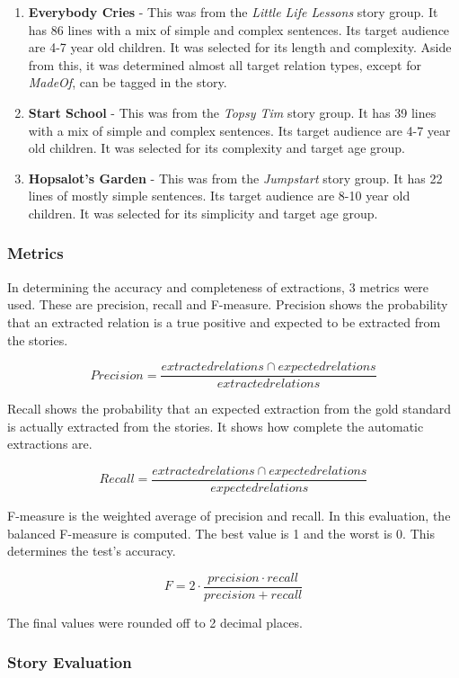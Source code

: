 \begin{enumerate}
\item \textbf{Everybody Cries} - This was from the \textit{Little Life Lessons} story group. It has 86 lines with a mix of simple and complex sentences. Its target audience are 4-7 year old children. It was selected for its length and complexity. Aside from this, it was determined almost all target relation types, except for \textit{MadeOf}, can be tagged in the story. 
\item \textbf{Start School} - This was from the \textit{Topsy Tim} story group. It has 39 lines with a mix of simple and complex sentences. Its target audience are 4-7 year old children. It was selected for its complexity and target age group. 
\item \textbf{Hopsalot's Garden} - This was from the \textit{Jumpstart} story group. It has 22 lines of mostly simple sentences. Its target audience are 8-10 year old children. It was selected for its simplicity and target age group. 
\end{enumerate}

\subsubsection*{Metrics}

In determining the accuracy and completeness of extractions, 3 metrics were used. These are precision, recall and F-measure. Precision shows the probability that an extracted relation is a true positive and expected to be extracted from the stories. 

\[Precision = \frac{extracted relations \cap expected relations}{extracted relations}\]

Recall shows the probability that an expected extraction from the gold standard is actually extracted from the stories. It shows how complete the automatic extractions are.

\[Recall = \frac{extracted relations \cap expected relations}{expected relations}\]

F-measure is the weighted average of precision and recall. In this evaluation, the balanced F-measure is computed. The best value is 1 and the worst is 0. This determines the test's accuracy.

\[F = 2 \cdot \frac{precision \cdot recall}{precision + recall}\]

The final values were rounded off to 2 decimal places.

\subsubsection{Story Evaluation}

